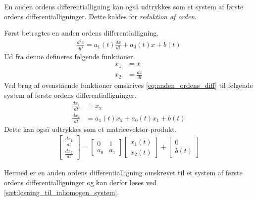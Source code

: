 

En anden ordens differentialligning kan også udtrykkes som et system af første ordens differentialligninger. Dette kaldes for \textit{reduktion af orden}.

Først betragtes en anden ordens differentialligning. 
\begin{align}\label{eq:anden_ordens_diff}
    \frac{d^2x}{dt^2}= a_1(t)\frac{dx}{dt}+a_0(t)x + b(t)
\end{align}
%
Ud fra denne defineres følgende funktioner.
%
\begin{align*}
    x_1&=x\\
    x_2 &= \frac{dx}{dt}
\end{align*}
%
Ved brug af ovenstående funktioner omskrives \eqref{eq:anden_ordens_diff} til følgende system af første ordens differentialligninger.
%
\begin{align*}
    \frac{dx_1}{dt} &= x_2\\
    \frac{dx_2}{dt} &= a_1(t)x_2 + a_0(t)x_1 + b(t)
\end{align*}
%
Dette kan også udtrykkes som et matricevektor-produkt.
%
\begin{align*}
    \begin{bmatrix}
        \frac{dx_1}{dt}\\
        \frac{dx_2}{dt}
    \end{bmatrix}
    =
    \begin{bmatrix}
    0 & 1\\
    a_0 & a_1
    \end{bmatrix}
    \begin{bmatrix}
        x_1(t)\\
        x_2(t)
    \end{bmatrix}
    + 
    \begin{bmatrix}
        0\\
        b(t)
    \end{bmatrix}
\end{align*}

Hermed er en anden ordens differentialligning omskrevet til et system af første ordens differentialligninger og kan derfor løses ved \autoref{sæt:løsning_til_inhomogen_system}.